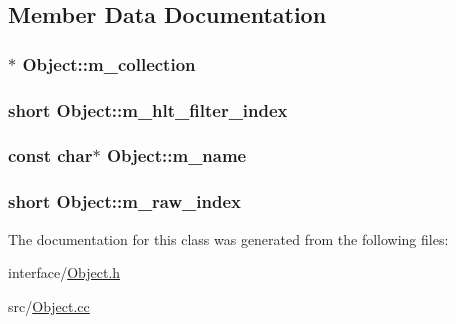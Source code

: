 \subsection{Member Data Documentation}
\hypertarget{class_object_af66cc1db553fa91b451c7855a8d09ec0}{}
\subsubsection[{m\+\_\+collection}]{$\ast$ Object\+::m\+\_\+collection\hspace{0.3cm}{\ttfamily [protected]}}\label{class_object_af66cc1db553fa91b451c7855a8d09ec0}
\hypertarget{class_object_ac1f71ac949f9d66cdeabca5dc7385a03}{}
\subsubsection[{m\+\_\+hlt\+\_\+filter\+\_\+index}]{\setlength{\rightskip}{0pt plus 5cm}short Object\+::m\+\_\+hlt\+\_\+filter\+\_\+index\hspace{0.3cm}{\ttfamily [protected]}}\label{class_object_ac1f71ac949f9d66cdeabca5dc7385a03}
\hypertarget{class_object_a90fd7f91e8f0f3eea7bc1eeed71ec3d6}{}
\subsubsection[{m\+\_\+name}]{\setlength{\rightskip}{0pt plus 5cm}const char$\ast$ Object\+::m\+\_\+name\hspace{0.3cm}{\ttfamily [protected]}}\label{class_object_a90fd7f91e8f0f3eea7bc1eeed71ec3d6}
\hypertarget{class_object_a75e13245ae926f83a29ce9b25b8e4aa5}{}
\subsubsection[{m\+\_\+raw\+\_\+index}]{\setlength{\rightskip}{0pt plus 5cm}short Object\+::m\+\_\+raw\+\_\+index\hspace{0.3cm}{\ttfamily [protected]}}\label{class_object_a75e13245ae926f83a29ce9b25b8e4aa5}


The documentation for this class was generated from the following files\+:\begin{DoxyCompactItemize}
\item 
interface/\hyperlink{_object_8h}{Object.\+h}\item 
src/\hyperlink{_object_8cc}{Object.\+cc}\end{DoxyCompactItemize}
